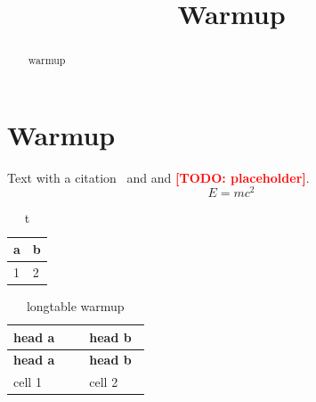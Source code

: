 \documentclass[11pt,a4paper]{article}
\title{Warmup}\author{}\date{}
\providecommand{\todo}[1]{\textcolor{red}{\textbf{[TODO: #1]}}}
\begin{document}
\maketitle
\begin{abstract}warmup\end{abstract}
\section{Warmup}\label{sec:warmup}
Text with a citation~\citep{warmup2020sample} and \citet{warmup2020sample} and \todo{placeholder}.
\begin{equation}E = mc^2\end{equation}
\begin{table}[t]\centering\begin{tabular}{ll}\toprule a & b \\ \midrule 1 & 2 \\ \bottomrule\end{tabular}\caption{t}\end{table}

\begin{longtable}{@{}p{0.5\linewidth}p{0.4\linewidth}@{}}
  \caption{longtable warmup}\label{tab:warm} \\
  \toprule
  {\raggedright\bfseries head a\par} & {\raggedright\bfseries head b\par} \\
  \midrule
  \endfirsthead
  \toprule
  {\raggedright\bfseries head a\par} & {\raggedright\bfseries head b\par} \\
  \midrule
  \endhead
  \midrule
  \endfoot
  \bottomrule
  \endlastfoot
  {\raggedright cell 1\par} & {\raggedright cell 2\par} \\
\end{longtable}

\end{document}
